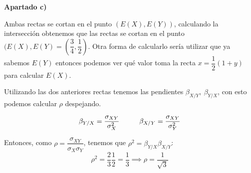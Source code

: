 \documentclass[openany]{book}
\begin{document}
\begin{exercise}
    \begin{flushright}
        \textbf{Apartado c)}
    \end{flushright}

    Ambas rectas se cortan en el punto $ (E(X),E(Y)) $, calculando la intersección obtenemos que las rectas se cortan en el punto $ (E(X),E(Y) = (\dfrac{3}{4},\dfrac{1}{2})$. Otra forma de calcularlo sería utilizar que ya sabemos $ E(Y) $ entonces podemos ver qué valor toma la recta $ x = \dfrac{1}{2}(1+y) $ para calcular $ E(X) $. 

    Utilizando las dos anteriores rectas tenemos las pendientes $ \beta_{X/Y},\ \beta_{Y/X} $, con esto podemos calcular $ \rho $ despejando.

    $$ \beta_{Y/X} = \dfrac{\sigma_{XY}}{\sigma_{X}^2}\hspace{10mm} \beta_{X/Y} = \dfrac{\sigma_{XY}}{\sigma_{Y}^2} $$

    Entonces, como $ \rho = \dfrac{\sigma_{XY}}{\sigma_{X}\sigma_{Y}} $, tenemos que $ \rho^2 = \beta_{Y/X}\beta_{X/Y} $:
    $$ \rho ^2 = \dfrac{2}{3}\dfrac{1}{2} = \dfrac{1}{3} \implies \rho = \dfrac{1}{\sqrt{3}} $$

\end{exercise}
\end{document}
